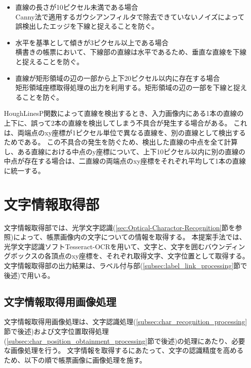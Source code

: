 \begin{itemize}
    \item 直線の長さが10ピクセル未満である場合\\
        Canny法で適用するガウシアンフィルタで除去できていないノイズによって誤検出したエッジを下線と捉えることを防ぐ。
    \item 水平を基準として傾きが3ピクセル以上である場合\\
        横書きの帳票において、下線部の直線は水平であるため、垂直な直線を下線と捉えることを防ぐ。
    \item 直線が矩形領域の辺の一部から上下20ピクセル以内に存在する場合\\
        矩形領域座標取得処理の出力を利用する。矩形領域の辺の一部を下線と捉えることを防ぐ。
\end{itemize}

HoughLinesP関数によって直線を検出するとき、入力画像内にある1本の直線の上下に、誤って2本の直線を検出してしまう不具合が発生する場合がある。
これは、両端点のxy座標が1ピクセル単位で異なる直線を、別の直線として検出するためである。
この不具合の発生を防ぐため、検出した直線の中点を全て計算し、ある直線における中点のy座標について、上下10ピクセル以内に別の直線の中点が存在する場合は、二直線の両端点のxy座標をそれぞれ平均して1本の直線に統一する。

\section{文字情報取得部}\label{sec:OCR_part}
文字情報取得部では、光学文字認識(\ref{sec:Optical-Charactor-Recognition}節を参照)によって、帳票画像内の文字についての情報を取得する。
本提案手法では、光学文字認識ソフトTesseract-OCRを用いて、文字と、文字を囲むバウンディングボックスの各頂点のxy座標を、それぞれ取得文字、文字位置として取得する。
文字情報取得部の出力結果は、ラベル付与部(\ref{subsec:label_link_processing}節で後述)で用いる。

\subsection{文字情報取得用画像処理}\label{subsec:image_processing_for_char_recognition}
文字情報取得用画像処理は、文字認識処理(\ref{subsec:char_recognition_processing}節で後述)および文字位置取得処理(\ref{subsec:char_position_obtainment_processing}節で後述)の処理にあたり、必要な画像処理を行う。
文字情報を取得するにあたって、文字の認識精度を高めるため、以下の順で帳票画像に画像処理を施す。

